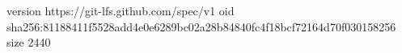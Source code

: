 version https://git-lfs.github.com/spec/v1
oid sha256:81188411f5528add4e0e6289bc02a28b84840fc4f18bcf72164d70f030158256
size 2440
